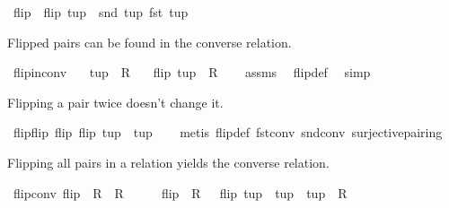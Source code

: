 \begin{isabellebody}
\begin{isamarkuptext}
\end{isamarkuptext}%
\isamarkuptrue%
\isamarkupfalse%
\ flip\ \ {\isachardoublequoteopen}flip\ tup\ {\isacharequal}\ {\isacharparenleft}snd\ tup{\isacharcomma}\ fst\ tup{\isacharparenright}{\isachardoublequoteclose}%
\begin{isamarkuptext}%
Flipped pairs can be found in the converse relation.%
\end{isamarkuptext}%
\isamarkuptrue%
\isamarkupfalse%
\ flip{\isacharunderscore}in{\isacharunderscore}conv{\isacharcolon}\isanewline
\ \ \ {\isachardoublequoteopen}tup\ {\isasymin}\ R{\isachardoublequoteclose}\isanewline
\ \ \ {\isachardoublequoteopen}flip\ tup\ {\isasymin}\ R{\isasyminverse}{\isachardoublequoteclose}\isanewline
%
\isadelimproof
\ \ %
\endisadelimproof
%
\isatagproof
{}\isamarkupfalse%
\ assms\ \isamarkupfalse%
\ flip{\isacharunderscore}def\ \isamarkupfalse%
\ simp%
\endisatagproof
{\isafoldproof}%
%
\isadelimproof
%
\endisadelimproof
%
\begin{isamarkuptext}%
Flipping a pair twice doesn't change it.%
\end{isamarkuptext}%
\isamarkuptrue%
\isamarkupfalse%
\ flip{\isacharunderscore}flip{\isacharcolon}\ {\isachardoublequoteopen}flip\ {\isacharparenleft}flip\ tup{\isacharparenright}\ {\isacharequal}\ tup{\isachardoublequoteclose}\isanewline
%
\isadelimproof
\ \ %
\endisadelimproof
%
\isatagproof
{}\isamarkupfalse%
\ {\isacharparenleft}metis\ flip{\isacharunderscore}def\ fst{\isacharunderscore}conv\ snd{\isacharunderscore}conv\ surjective{\isacharunderscore}pairing{\isacharparenright}%
\endisatagproof
{\isafoldproof}%
%
\isadelimproof
%
\endisadelimproof
%
\begin{isamarkuptext}%
Flipping all pairs in a relation yields the converse relation.%
\end{isamarkuptext}%
\isamarkuptrue%
\isamarkupfalse%
\ flip{\isacharunderscore}conv{\isacharcolon}\ {\isachardoublequoteopen}flip\ {\isacharbackquote}\ R\ {\isacharequal}\ R{\isasyminverse}{\isachardoublequoteclose}\isanewline
%
\isadelimproof
%
\endisadelimproof
%
\isatagproof
{}\isamarkupfalse%
\ {\isacharminus}\isanewline
\ \ \isamarkupfalse%
\ {\isachardoublequoteopen}flip\ {\isacharbackquote}\ R\ {\isacharequal}\ {\isacharbraceleft}\ flip\ tup\ {\isacharbar}\ tup\ {\isachardot}\ tup\ {\isasymin}\ R\ {\isacharbraceright}{\isachardoublequoteclose}\ \isamarkupfalse%

\end{isabellebody}

